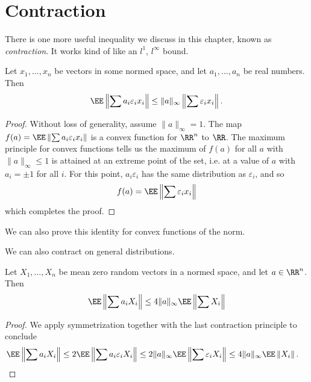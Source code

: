 \section{Contraction}

There is one more useful inequality we discuss in this chapter, known as \emph{ contraction}. It works kind of like an $l^1$, $l^\infty$ bound.

\begin{theorem}
    Let $x_1, \dots, x_n$ be vectors in some normed space, and let $a_1, \dots, a_n$ be real numbers. Then
    \[ \EE \left\| \sum a_i \varepsilon_i x_i \right\| \leq \| a \|_\infty \left\| \sum \varepsilon_i x_i \right\|. \]
\end{theorem}
\begin{proof}
	Without loss of generality, assume $\| a \|_\infty = 1$. The map $f(a) = \EE \left\| \sum a_i \varepsilon_i x_i \right\|$ is a convex function for $\RR^n$ to $\RR$. The maximum principle for convex functions tells us the maximum of $f(a)$ for all $a$ with $\| a \|_\infty \leq 1$ is attained at an extreme point of the set, i.e. at a value of $a$ with $a_i = \pm 1$ for all $i$. For this point, $a_i \varepsilon_i$ has the same distribution as $\varepsilon_i$, and so
	\[ f(a) = \EE \left\| \sum \varepsilon_i x_i \right\| \]
	which completes the proof.
\end{proof}

\begin{remark}
    We can also prove this identity for convex functions of the norm.
\end{remark}

We can also contract on general distributions.

\begin{theorem}
	Let $X_1,\dots, X_n$ be mean zero random vectors in a normed space, and let $a \in \RR^n$. Then
	\[ \EE \left\| \sum a_i X_i \right\| \leq 4 \| a \|_\infty \EE \left\| \sum X_i \right\| \]
\end{theorem}
\begin{proof}
	We apply symmetrization together with the last contraction principle to conclude
	\begin{align*}
		\EE \left\| \sum a_i X_i \right\| &\leq 2 \EE \left\| \sum a_i \varepsilon_i X_i \right\| \leq 2 \| a \|_\infty \EE \left\| \sum \varepsilon_i X_i \right\| \leq 4 \| a \|_\infty \EE \left\| X_i \right\|. \qedhere
	\end{align*}
\end{proof}

